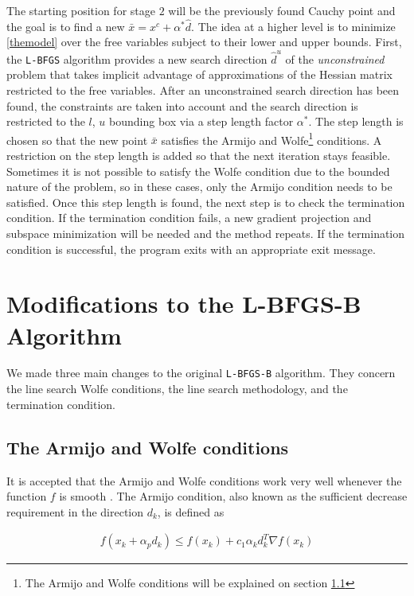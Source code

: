 The starting position for stage $2$ will be the previously found Cauchy point and the goal is to find a new $\bar{x} = x^c + \alpha^* \hat{d}$. The idea at a higher level is to minimize \eqref{themodel} over the free variables subject to their lower and upper bounds. First, the \texttt{L-BFGS} algorithm provides a new search direction $\hat{d}^u$ of the \emph{unconstrained} problem that takes implicit advantage of approximations of the Hessian matrix restricted to the free variables. After an unconstrained search direction has been found, the constraints are taken into account and the search direction is restricted to the $l$, $u$ bounding box via a step length factor $\alpha^*$. The step length is chosen so that the new point $\bar{x}$ satisfies the Armijo and Wolfe\footnote{The Armijo and Wolfe conditions will be explained on section \ref{Wolfeconditions}} conditions. A restriction on the step length is added so that the next iteration stays feasible. Sometimes it is not possible to satisfy the Wolfe condition due to the bounded nature of the problem, so in these cases, only the Armijo condition needs to be satisfied. Once this step length is found, the next step is to check the termination condition. If the termination condition fails, a new gradient projection and subspace minimization will be needed and the method repeats. If the termination condition is successful, the program exits with an appropriate exit message.

\chapter{Modifications to the L-BFGS-B Algorithm}

We made three main changes to the original \texttt{L-BFGS-B} algorithm. They concern the line search Wolfe conditions, the line search methodology, and the termination condition.

\section{The Armijo and Wolfe conditions} \label{Wolfeconditions}

It is accepted that the Armijo and Wolfe conditions work very well whenever the function $f$ is smooth \citep{MR1855221}. The Armijo condition, also known as the sufficient decrease requirement in the direction $d_k$, is defined as

\begin{equation} \label{armijocondition}
  \begin{aligned}
    f(x_k + \alpha_p d_k) \leq f(x_k) + c_1 \alpha_k d_k^T \nabla f(x_k)
  \end{aligned}
\end{equation}

